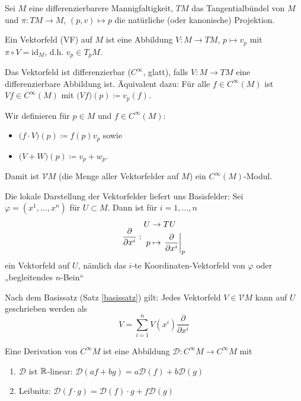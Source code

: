 \documentclass[a4paper,twoside,DIV15,BCOR12mm]{scrbook}
\renewcommand{\da}{\coloneqq}
\newcommand{\VM}{\mathcal V M}
\begin{document}
\begin{definition}
Sei $M$ eine differenzierbarere Mannigfaltigkeit, $TM$ das Tangentialbündel von $M$ und $\pi: TM \to M$, $(p,v)\mapsto p$ die natürliche (oder kanonische) Projektion.

Ein Vektorfeld (VF) auf $M$ ist eine Abbildung $V : M \to TM$, $p\mapsto v_p$ mit $\pi \circ V = \text{id}_M$, d.h. $v_p \in T_pM$.

Das Vektorfeld ist differenzierbar ($C^\infty$, glatt), falls $V: M \to TM$ eine differenzierbare Abbildung ist. Äquivalent dazu: Für alle $f\in C^\infty(M)$ ist $Vf\in C^\infty(M)$ mit $\big(Vf\big)(p) \da v_p(f)$.

Wir definieren für $p\in M$ und $f\in C^\infty(M)$:
\begin{itemize}
\item $\big(f\cdot V\big)(p) \da f(p) v_p$ sowie
\item $\big(V+W\big)(p) \da v_p + w_p$.
\end{itemize}
Damit ist $\VM$ (die Menge aller Vektorfelder auf $M$) ein $C^\infty(M)$-Modul.
\end{definition}

Die lokale Darstellung der Vektorfelder liefert uns Basisfelder:
Sei $\varphi = (x^1,\ldots,x^n)$ für $U\subset M$. Dann ist für $i=1,\ldots,n$
\[
\frac{\partial}{\partial x^i}:
\begin{aligned}
U&\to TU\\
p&\mapsto \left.\frac{\partial}{\partial x^{i}}\right|_p
\end{aligned}
\]
ein Vektorfeld auf $U$, nämlich das $i$-te Koordinaten-Vektorfeld von $\varphi$ oder „begleitendes $n$-Bein“

Nach dem Basissatz (Satz \ref{basissatz}) gilt: Jedes Vektorfeld $V\in \VM $ kann auf $U$ geschrieben werden als 
\[
V = \sum_{i=1}^n V(x^i) \frac{\partial}{\partial x^i}
\]

\begin{definition}
Eine Derivation von $C^\infty M$ ist eine Abbildung $\mathcal{D}: C^\infty M \to C^\infty M$ mit
\begin{enumerate}[(D1)]
\item $\mathcal{D}$ ist $\mathbb{R}$-linear: $\mathcal{D}(af+ bg) = a\mathcal D(f) + b\mathcal D(g)$
\item Leibnitz: $\mathcal D(f\cdot g) = \mathcal D(f)\cdot g + f\mathcal D(g)$
\end{enumerate}
\end{definition}
\end{document}
